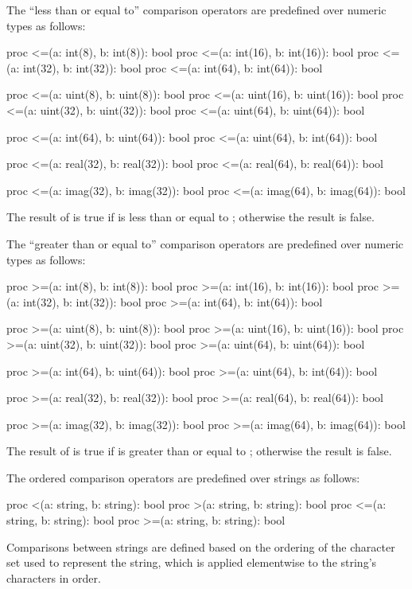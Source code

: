 The ``less than or equal to'' comparison operators are predefined over
numeric types as follows:
\begin{chapel}
proc <=(a: int(8), b: int(8)): bool
proc <=(a: int(16), b: int(16)): bool
proc <=(a: int(32), b: int(32)): bool
proc <=(a: int(64), b: int(64)): bool

proc <=(a: uint(8), b: uint(8)): bool
proc <=(a: uint(16), b: uint(16)): bool
proc <=(a: uint(32), b: uint(32)): bool
proc <=(a: uint(64), b: uint(64)): bool

proc <=(a: int(64), b: uint(64)): bool
proc <=(a: uint(64), b: int(64)): bool

proc <=(a: real(32), b: real(32)): bool
proc <=(a: real(64), b: real(64)): bool

proc <=(a: imag(32), b: imag(32)): bool
proc <=(a: imag(64), b: imag(64)): bool
\end{chapel}
The result of  is true if  is less than or equal
to ; otherwise the result is false.

The ``greater than or equal to'' comparison operators are predefined
over numeric types as follows:
\begin{chapel}
proc >=(a: int(8), b: int(8)): bool
proc >=(a: int(16), b: int(16)): bool
proc >=(a: int(32), b: int(32)): bool
proc >=(a: int(64), b: int(64)): bool

proc >=(a: uint(8), b: uint(8)): bool
proc >=(a: uint(16), b: uint(16)): bool
proc >=(a: uint(32), b: uint(32)): bool
proc >=(a: uint(64), b: uint(64)): bool

proc >=(a: int(64), b: uint(64)): bool
proc >=(a: uint(64), b: int(64)): bool

proc >=(a: real(32), b: real(32)): bool
proc >=(a: real(64), b: real(64)): bool

proc >=(a: imag(32), b: imag(32)): bool
proc >=(a: imag(64), b: imag(64)): bool
\end{chapel}
The result of  is true if  is greater than or
equal to ; otherwise the result is false.

The ordered comparison operators are predefined over strings as follows:
\begin{chapel}
proc <(a: string, b: string): bool
proc >(a: string, b: string): bool
proc <=(a: string, b: string): bool
proc >=(a: string, b: string): bool
\end{chapel}
Comparisons between strings are defined based on the ordering of the
character set used to represent the string, which is applied
elementwise to the string's characters in order.


